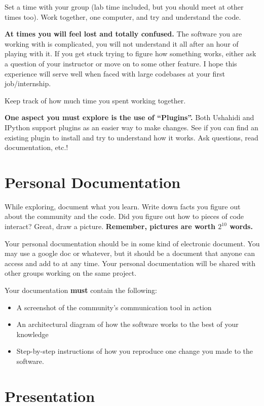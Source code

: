 \documentclass[letterpaper]{article}
\begin{document}
Set a time with your group (lab time included, but you should meet at other
times too).  Work together, one computer, and try and understand the code.

{\bf At times you will feel lost and totally confused.}  The software you are
working with is 
complicated, you will not understand it all after an hour of playing with it.
If you get stuck trying to figure how something works, either ask a question of
your instructor or move on to some other feature.  I hope this experience will
serve well when faced with large codebases at your first job/internship.

Keep track of how much time you spent working together.

{\bf One aspect you must explore is the use of ``Plugins''.}  Both Ushahidi and
IPython support plugins as an easier way to make changes.  See if you can find
an existing plugin to install and try to understand how it works.  Ask questions, read documentation, etc.!

\section*{Personal Documentation}

While exploring, document what you learn.  Write down facts you figure out
about the community and the code.
Did you figure out how to pieces of code interact?  Great, draw a picture.
{\bf Remember, pictures are worth $2^{10}$ words.}

Your personal documentation should be in some kind of electronic document.
You may use a google doc or whatever, but it should be a document that anyone
can access and add to at any time.  Your personal documentation will be shared
with other groups working on the same project.

Your documentation {\bf must} contain the following:

\begin{itemize}
  \item A screenshot of the community's communication tool in action
  \item An architectural diagram of how the software works to the best of your
    knowledge
  \item Step-by-step instructions of how you reproduce one change you made to
    the software.
\end{itemize}

\section*{Presentation}
\end{document}
